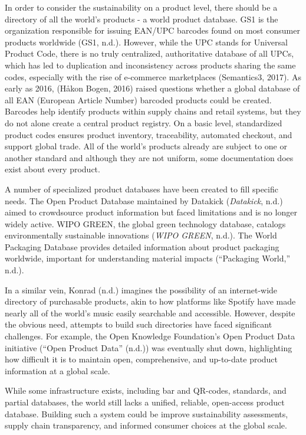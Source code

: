 \documentclass[
  12pt,
  letterpaper,
  DIV=11,
  numbers=noendperiod]{scrartcl}
\begin{document}
In order to consider the sustainability on a product level, there should
be a directory of all the world's products - a world product database.
GS1 is the organization responsible for issuing EAN/UPC barcodes found
on most consumer products worldwide (GS1, n.d.). However, while the UPC
stands for Universal Product Code, there is no truly centralized,
authoritative database of all UPCs, which has led to duplication and
inconsistency across products sharing the same codes, especially with
the rise of e-commerce marketplaces (Semantics3, 2017). As early as
2016, (Håkon Bogen, 2016) raised questions whether a global database of
all EAN (European Article Number) barcoded products could be created.
Barcodes help identify products within supply chains and retail systems,
but they do not alone create a central product registry. On a basic
level, standardized product codes ensures product inventory,
traceability, automated checkout, and support global trade. All of the
world's products already are subject to one or another standard and
although they are not uniform, some documentation does exist about every
product.

A number of specialized product databases have been created to fill
specific needs. The Open Product Database maintained by Datakick
(\emph{Datakick}, n.d.) aimed to crowdsource product information but
faced limitations and is no longer widely active. WIPO GREEN, the global
green technology database, catalogs environmentally sustainable
innovations (\emph{{WIPO GREEN}}, n.d.). The World Packaging Database
provides detailed information about product packaging worldwide,
important for understanding material impacts ({``Packaging {World},''}
n.d.).

In a similar vein, Konrad (n.d.) imagines the possibility of an
internet-wide directory of purchasable products, akin to how platforms
like Spotify have made nearly all of the world's music easily searchable
and accessible. However, despite the obvious need, attempts to build
such directories have faced significant challenges. For example, the
Open Knowledge Foundation's Open Product Data initiative ({``Open
{Product Data}''} (n.d.)) was eventually shut down, highlighting how
difficult it is to maintain open, comprehensive, and up-to-date product
information at a global scale.

While some infrastructure exists, including bar and QR-codes, standards,
and partial databases, the world still lacks a unified, reliable,
open-access product database. Building such a system could be improve
sustainability assessments, supply chain transparency, and informed
consumer choices at the global scale.
\end{document}
